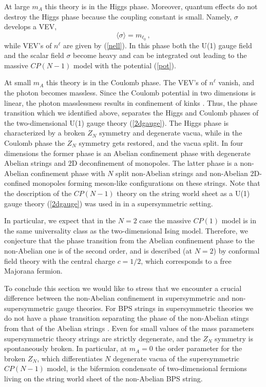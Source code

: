 At large $m_A$ this theory is in the Higgs phase. Moreover, quantum effects
do not destroy the Higgs phase because 
the coupling constant is small.  Namely,
$\sigma$ develops a VEV,
$$
\langle \sigma\rangle =
m_{\ell_0}\,,
$$ 
while VEV's of $n^{\ell}$ 
are given by (\ref{nell}). In this phase both the U(1) gauge field and 
the scalar field
$\sigma$ become heavy and can be integrated out leading to the 
massive $CP(N-1)$ model with the potential (\ref{pot}).

At small $m_A$  this theory is in the Coulomb phase. The VEV's of
$n^{\ell}$ vanish, and the photon becomes massless. 
Since the Coulomb potential
in two dimensions is linear, the photon masslessness
results in   confinement of kinks \cite{5}.
Thus, the phase transition which we identified above, separates
the Higgs and Coulomb phases of the  two-dimensional U(1) gauge theory
(\ref{2dgauge}). The Higgs phase is characterized by a
broken $Z_N$ symmetry and degenerate vacua, while in  the
Coulomb phase the $Z_N$ symmetry
gets restored,  and the  vacua split.  In four dimensions the
former phase is an Abelian confinement phase with degenerate
Abelian strings and 2D deconfinement of monopoles. The latter phase
is a non-Abelian confinement phase with $N$ split non-Abelian strings
and  non-Abelian 2D-confined monopoles forming meson-like
configurations on these strings. Note that the description of
the $CP(N-1)$
theory on the string world sheet as a U(1) gauge theory (\ref{2dgauge})
was used in \cite{HananyTong} in a supersymmetric setting.

In particular,
we expect that in the $N=2$ case
the massive $CP(1)$ model is in the same universality class
as the two-dimensional Ising model. Therefore, we conjecture that the
phase transition from the Abelian  confinement phase to the non-Abelian 
one is of the second order, and is described
(at $N=2$) by   conformal field theory
with the central charge $c=1/2$, which corresponds to a
free Majorana fermion.

To conclude this section we would like to stress that
we encounter a crucial difference between the non-Abelian confinement
in supersymmetric and non-supersymmet\-ric gauge theories.
For BPS strings in
supersymmetric theories we do not have a phase transition separating
the phase of the non-Abelian stings from that of the Abelian strings
\cite{ShifmanYung,HananyTong}. Even for small values of
the mass parameters supersymmetric theory
strings are strictly degenerate, and the $Z_N$ symmetry is
spontaneously broken. In particular, at $m_A=0$ the order parameter
for the broken $Z_N$, which
differentiates  $N$ degenerate vacua of the supersymmetric $CP(N-1)$
model, is the bifermion condensate of two-dimensional fermions living
on the string world sheet of the non-Abelian BPS string. 

